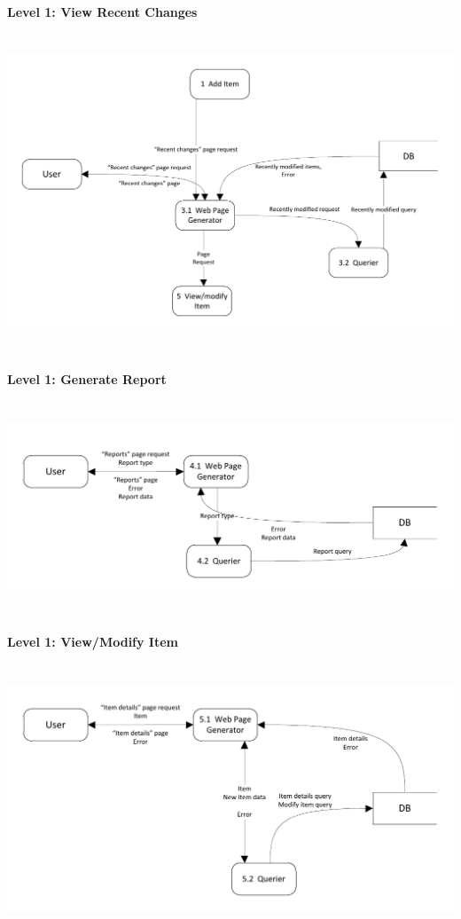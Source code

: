 \documentclass{article}
\begin{document}
\paragraph{Level 1: View Recent Changes}
~\\
\includegraphics[keepaspectratio, width=6.5in]{dfd_level1_view_recent_changes.pdf}\\
~\\

\paragraph{Level 1: Generate Report}
~\\
\includegraphics[keepaspectratio, width=6.5in]{dfd_level1_generate_report.pdf}\\
~\\

\paragraph{Level 1: View/Modify Item}
~\\
\includegraphics[keepaspectratio, width=6.5in]{dfd_level1_view_modify_item.pdf}\\
~\\
\end{document}

